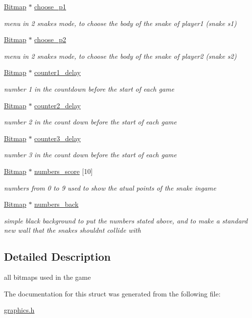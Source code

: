\begin{DoxyCompactItemize}
\hyperlink{structBitmap}{Bitmap} $\ast$ \hyperlink{group__graphics_ga1c051bf49f7de6f60eb93649684ebfb5}{choose\+\_\+p1}
\begin{DoxyCompactList}\small\item\em menu in 2 snakes mode, to choose the body of the snake of player1 (snake s1) \end{DoxyCompactList}\item 
\hyperlink{structBitmap}{Bitmap} $\ast$ \hyperlink{group__graphics_gabe0652c58a65bf0ccd93497ab08d9cfb}{choose\+\_\+p2}
\begin{DoxyCompactList}\small\item\em menu in 2 snakes mode, to choose the body of the snake of player2 (snake s2) \end{DoxyCompactList}\item 
\hyperlink{structBitmap}{Bitmap} $\ast$ \hyperlink{group__graphics_ga0d2f0b6ce3ed9e3fbdca9fb0e2197c8f}{counter1\+\_\+delay}
\begin{DoxyCompactList}\small\item\em number 1 in the countdown before the start of each game \end{DoxyCompactList}\item 
\hyperlink{structBitmap}{Bitmap} $\ast$ \hyperlink{group__graphics_gabbfd3197d8f58f68356e4c404c9b41a7}{counter2\+\_\+delay}
\begin{DoxyCompactList}\small\item\em number 2 in the count down before the start of each game \end{DoxyCompactList}\item 
\hyperlink{structBitmap}{Bitmap} $\ast$ \hyperlink{group__graphics_gac1063b5ae836e49a51d16a672c9cc11f}{counter3\+\_\+delay}
\begin{DoxyCompactList}\small\item\em number 3 in the count down before the start of each game \end{DoxyCompactList}\item 
\hyperlink{structBitmap}{Bitmap} $\ast$ \hyperlink{group__graphics_gac29eba55edb941d1896f1ea16ba40601}{numbers\+\_\+score} \mbox{[}10\mbox{]}
\begin{DoxyCompactList}\small\item\em numbers from 0 to 9 used to show the atual points of the snake ingame \end{DoxyCompactList}\item 
\hyperlink{structBitmap}{Bitmap} $\ast$ \hyperlink{group__graphics_ga416a4e7839cf0a547fcf830f0e5e3cf3}{numbers\+\_\+back}
\begin{DoxyCompactList}\small\item\em simple black background to put the numbers stated above, and to make a standard new wall that the snakes should\textquotesingle{}nt collide with \end{DoxyCompactList}\end{DoxyCompactItemize}


\subsection{Detailed Description}
all bitmaps used in the game 

The documentation for this struct was generated from the following file\+:\begin{DoxyCompactItemize}
\item 
\hyperlink{graphics_8h}{graphics.\+h}\end{DoxyCompactItemize}
